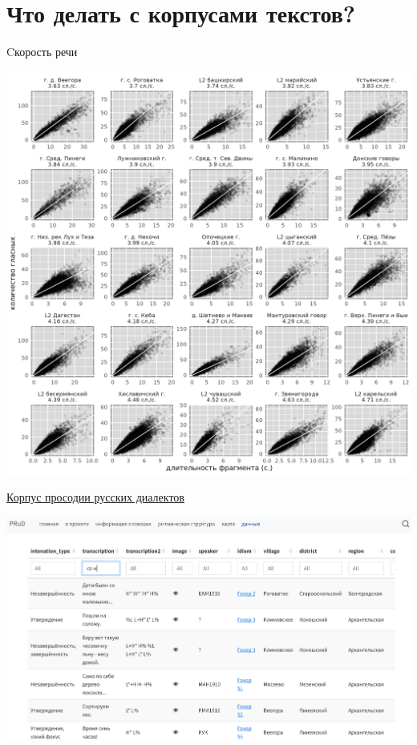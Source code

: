 \documentclass[
  ignorenonframetext,
]{beamer}
\begin{document}
\hypertarget{ux447ux442ux43e-ux434ux435ux43bux430ux442ux44c-ux441-ux43aux43eux440ux43fux443ux441ux430ux43cux438-ux442ux435ux43aux441ux442ux43eux432}{%
\section{Что делать с корпусами
текстов?}\label{ux447ux442ux43e-ux434ux435ux43bux430ux442ux44c-ux441-ux43aux43eux440ux43fux443ux441ux430ux43cux438-ux442ux435ux43aux441ux442ux43eux432}}

\begin{frame}{Cкорость речи \citep[382]{moroz23}}
\protect\hypertarget{cux43aux43eux440ux43eux441ux442ux44c-ux440ux435ux447ux438-moroz23-382}{}
\begin{center}\includegraphics[width=0.8\linewidth]{images/04_speech_rate} \end{center}
\end{frame}

\begin{frame}{\href{https://lingconlab.github.io/PRuD/}{Корпус просодии
русских диалектов} \citep{knyazev24}}
\protect\hypertarget{ux43aux43eux440ux43fux443ux441-ux43fux440ux43eux441ux43eux434ux438ux438-ux440ux443ux441ux441ux43aux438ux445-ux434ux438ux430ux43bux435ux43aux442ux43eux432-knyazev24}{}
\begin{center}\includegraphics[width=0.99\linewidth]{images/05_PRuD} \end{center}
\end{frame}
\end{document}
